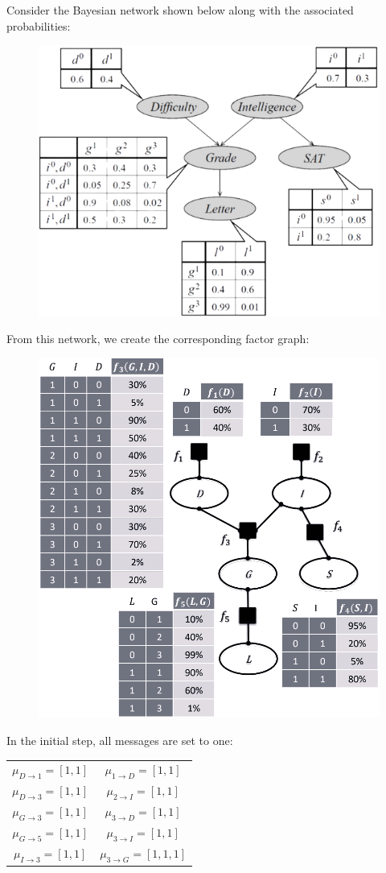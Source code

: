 \begin{example}
    Consider the Bayesian network shown below along with the associated probabilities:
    \begin{figure}[H]
        \centering
        \includegraphics[width=0.5\linewidth]{images/bay.png}
    \end{figure}
    From this network, we create the corresponding factor graph:
    \begin{figure}[H]
        \centering
        \includegraphics[width=0.5\linewidth]{images/bayfac.png}
    \end{figure}
    In the initial step, all messages are set to one:
    \begin{table}[H]
        \centering
        \begin{tabular}{|cc|}
        \hline
        $\mu_{D \rightarrow 1}=[1,1]$ & $\mu_{1 \rightarrow D}=[1,1]$   \\
        $\mu_{D \rightarrow 3}=[1,1]$ & $\mu_{2 \rightarrow I}=[1,1]$   \\
        $\mu_{G \rightarrow 3}=[1,1]$ & $\mu_{3 \rightarrow D}=[1,1]$   \\
        $\mu_{G \rightarrow 5}=[1,1]$ & $\mu_{3 \rightarrow I}=[1,1]$   \\
        $\mu_{I \rightarrow 3}=[1,1]$ & $\mu_{3 \rightarrow G}=[1,1,1]$ \\

\end{tabular}
\end{table}
\end{example}
